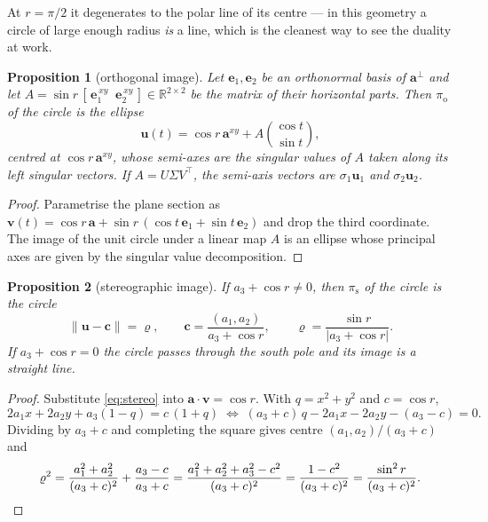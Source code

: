 \documentclass[11pt,a4paper]{article}
\newcommand{\R}{\mathbb{R}}
\newcommand{\proj}[1]{\pi_{\mathrm{#1}}}
\newcommand{\po}{\proj{o}}
\newcommand{\ps}{\proj{s}}
\newcommand{\vv}{\mathbf{v}}
\newcommand{\ee}{\mathbf{e}}
\newcommand{\uu}{\mathbf{u}}
\newcommand{\aaa}{\mathbf{a}}
\newcommand{\cc}{\mathbf{c}}
\newcommand{\norm}[1]{\lVert #1 \rVert}
\newcommand{\abs}[1]{\lvert #1 \rvert}
\theoremstyle{plain}
\newtheorem{proposition}{Proposition}[section]
\theoremstyle{definition}
\theoremstyle{remark}
\begin{document}
At $r=\pi/2$ it degenerates to the polar line of its centre --- in this geometry
a circle of large enough radius \emph{is} a line, which is the cleanest way to
see the duality at work.

\begin{proposition}[orthogonal image]
\label{prop:circle-ortho}
Let $\ee_1,\ee_2$ be an orthonormal basis of $\aaa^{\perp}$ and let
$A=\sin r\,[\,\ee_1^{\,xy}\;\;\ee_2^{\,xy}\,]\in\R^{2\times2}$ be the matrix of
their horizontal parts. Then $\po$ of the circle is the ellipse
\begin{equation}
  \uu(t)=\cos r\,\aaa^{xy}+A\binom{\cos t}{\sin t},
\end{equation}
centred at $\cos r\,\aaa^{xy}$, whose semi-axes are the singular values of $A$
taken along its left singular vectors. If $A=U\Sigma V^{\!\top}$, the semi-axis
vectors are $\sigma_1\uu_1$ and $\sigma_2\uu_2$.
\end{proposition}

\begin{proof}
Parametrise the plane section as
$\vv(t)=\cos r\,\aaa+\sin r\,(\cos t\,\ee_1+\sin t\,\ee_2)$ and drop the third
coordinate. The image of the unit circle under a linear map $A$ is an ellipse
whose principal axes are given by the singular value decomposition.
\end{proof}

\begin{proposition}[stereographic image]
If $a_3+\cos r\neq0$, then $\ps$ of the circle is the circle
\begin{equation}
  \label{eq:circle-stereo}
  \norm{\uu-\cc}=\varrho,
  \qquad
  \cc=\frac{(a_1,a_2)}{a_3+\cos r},
  \qquad
  \varrho=\frac{\sin r}{\abs{a_3+\cos r}} .
\end{equation}
If $a_3+\cos r=0$ the circle passes through the south pole and its image is a
straight line.
\end{proposition}

\begin{proof}
Substitute \eqref{eq:stereo} into $\aaa\cdot\vv=\cos r$. With $q=x^2+y^2$ and
$c=\cos r$,
\[
  2a_1x+2a_2y+a_3(1-q)=c\,(1+q)
  \;\Longleftrightarrow\;
  (a_3+c)\,q-2a_1x-2a_2y-(a_3-c)=0 .
\]
Dividing by $a_3+c$ and completing the square gives centre
$(a_1,a_2)/(a_3+c)$ and
\[
  \varrho^2=\frac{a_1^2+a_2^2}{(a_3+c)^2}+\frac{a_3-c}{a_3+c}
          =\frac{a_1^2+a_2^2+a_3^2-c^2}{(a_3+c)^2}
          =\frac{1-c^2}{(a_3+c)^2}=\frac{\sin^2 r}{(a_3+c)^2}.
  \qedhere
\]
\end{proof}
\end{document}
